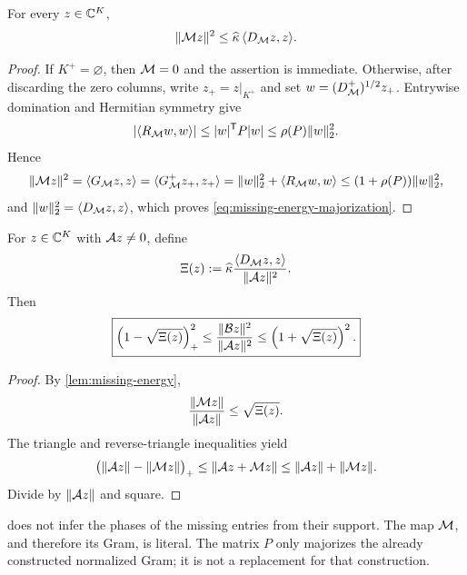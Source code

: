 \begin{lemma}
\label{lem:missing-energy}
For every \(z\in\mathbb C^K\),
\begin{equation}
 \|\mathcal M z\|^2
 \le
 \widehat\kappa\,
 \langle D_{\mathcal M}z,z\rangle.
 \label{eq:missing-energy-majorization}
\end{equation}
\end{lemma}

\begin{proof}
If \(K^+=\varnothing\), then \(\mathcal M=0\) and the assertion is
immediate.  Otherwise, after discarding the zero columns, write
\(z_+=z|_{K^+}\) and set
\(w=(D_{\mathcal M}^+)^{1/2}z_+\).  Entrywise domination and Hermitian
symmetry give
\[
 |\langle R_{\mathcal M}w,w\rangle|
 \le |w|^{\mathsf T}P|w|
 \le \rho(P)\|w\|_2^2.
\]
Hence
\[
 \|\mathcal M z\|^2
 =\langle G_{\mathcal M}z,z\rangle
 =\langle G_{\mathcal M}^+z_+,z_+\rangle
 =\|w\|_2^2+\langle R_{\mathcal M}w,w\rangle
 \le(1+\rho(P))\|w\|_2^2,
\]
and
\(\|w\|_2^2=\langle D_{\mathcal M}z,z\rangle\), which proves
\eqref{eq:missing-energy-majorization}.
\end{proof}

\begin{theorem}
\label{thm:coefficient-specific}
For \(z\in\mathbb C^K\) with \(\mathcal A z\ne0\), define
\begin{equation}
 \Xi(z):=
 \widehat\kappa
 \frac{\langle D_{\mathcal M}z,z\rangle}
      {\|\mathcal A z\|^2}.
 \label{eq:Xi-definition}
\end{equation}
Then
\begin{equation}
 \boxed{
 \left(1-\sqrt{\Xi(z)}\right)_+^2
 \le
 \frac{\|\mathcal B z\|^2}{\|\mathcal A z\|^2}
 \le
 \left(1+\sqrt{\Xi(z)}\right)^2.}
 \label{eq:coefficient-specific-survival}
\end{equation}
\end{theorem}

\begin{proof}
By \cref{lem:missing-energy},
\[
 \frac{\|\mathcal M z\|}{\|\mathcal A z\|}
 \le\sqrt{\Xi(z)}.
\]
The triangle and reverse-triangle inequalities yield
\[
 \bigl(\|\mathcal A z\|-\|\mathcal M z\|\bigr)_+
 \le\|\mathcal A z+\mathcal M z\|
 \le\|\mathcal A z\|+\|\mathcal M z\|.
\]
Divide by \(\|\mathcal A z\|\) and square.
\end{proof}

\begin{remark}
 does not infer the phases of the
missing entries from their support.  The map \(\mathcal M\), and therefore
its Gram, is literal.  The matrix \(P\) only majorizes the already
constructed normalized Gram; it is not a replacement for that
construction.
\end{remark}

